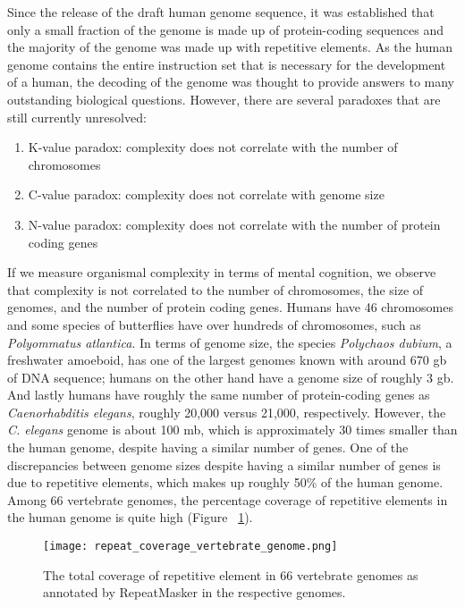 Since the release of the draft human genome sequence\cite{venter2001sequence, lander2001initial}, it was established that only a small fraction of the genome is made up of protein-coding sequences and the majority of the genome was made up with repetitive elements. As the human genome contains the entire instruction set that is necessary for the development of a human, the decoding of the genome was thought to provide answers to many outstanding biological questions. However, there are several paradoxes that are still currently unresolved:

\begin{enumerate}
   \item K-value paradox: complexity does not correlate with the number of chromosomes
   \item C-value paradox: complexity does not correlate with genome size
   \item N-value paradox: complexity does not correlate with the number of protein coding genes
\end{enumerate}

If we measure organismal complexity in terms of mental cognition, we observe that complexity is not correlated to the number of chromosomes, the size of genomes, and the number of protein coding genes. Humans have 46 chromosomes and some species of butterflies have over hundreds of chromosomes, such as \textit{Polyommatus atlantica}. In terms of genome size, the species \textit{Polychaos dubium}, a freshwater amoeboid, has one of the largest genomes known with around 670 gb of DNA sequence; humans on the other hand have a genome size of roughly 3 gb. And lastly humans have roughly the same number of protein-coding genes as \textit{Caenorhabditis elegans}, roughly 20,000 versus 21,000, respectively. However, the \textit{C. elegans} genome is about 100 mb\cite{celegans1998sequencing}, which is approximately 30 times smaller than the human genome, despite having a similar number of genes. One of the discrepancies between genome sizes despite having a similar number of genes is due to repetitive elements, which makes up roughly 50\% of the human genome. Among 66 vertebrate genomes, the percentage coverage of repetitive elements in the human genome is quite high (Figure ~\ref{fig:repeat_coverage_vertebrate_genome}).

\begin{figure}[h]
   \centering
   \texttt{[image: repeat\_coverage\_vertebrate\_genome.png]}
   \caption[Coverage of repetitive elements in vertebrate genomes]{The total coverage of repetitive element in 66 vertebrate genomes as annotated by RepeatMasker in the respective genomes\cite{tang2014repcoverage}.}
   \label{fig:repeat_coverage_vertebrate_genome}
\end{figure}

